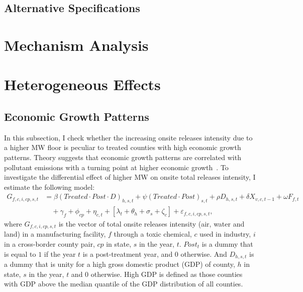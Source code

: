\documentclass[12pt, english]{article}
\begin{document}
    \subsection{Alternative Specifications}\label{subsec:alternative-specifications}


    \section{Mechanism Analysis}\label{sec:mechanism-analysis}


    \section{Heterogeneous Effects}\label{sec:heterogeneous-effects}

    \subsection{Economic Growth Patterns}\label{subsec:economic-growth-patterns}
    In this subsection, I check whether the increasing onsite releases intensity due to a higher MW floor is peculiar to treated counties with high economic growth patterns. Theory suggests that economic growth patterns are correlated with pollutant emissions with a turning point at higher economic growth~\parencite{grossman1995economic, shapiro2018pollution}. To investigate the differential effect of higher MW on onsite total releases intensity, I estimate the following model:
    \begin{align}
        G_{f,c,i,cp,s,t} &= \beta (Treated \cdot Post \cdot D)_{h,s,t} + \psi (Treated \cdot Post)_{s,t} + \rho D_{h,s,t} + \delta X_{v,c,t-1} + \omega F_{f,t} \nonumber \\
        &\quad + \gamma_{f} + \phi_{cp} + \eta_{c,t} + \left[\lambda_{t} + \theta_{h} + \sigma_{s} + \zeta_{c} \right] + \varepsilon_{f,c,i,cp,s,t},\label{eq:heterogeneous-onsite-releases-intensity-gdp}
    \end{align}
    where $G_{f,c,i,cp,s,t}$ is the vector of total onsite releases intensity (air, water and land) in a manufacturing facility, $f$ through a toxic chemical, $c$ used in industry, $i$ in a cross-border county pair, $cp$ in state, $s$ in the year, $t$. $Post_{t}$ is a dummy that is equal to $1$ if the year $t$ is a post-treatment year, and $0$ otherwise. And $D_{h,s,t}$ is a dummy that is unity for a high gross domestic product (GDP) of county, $h$ in state, $s$ in the year, $t$ and $0$ otherwise. High GDP is defined as those counties with GDP above the median quantile of the GDP distribution of all counties.
    
\end{document}
